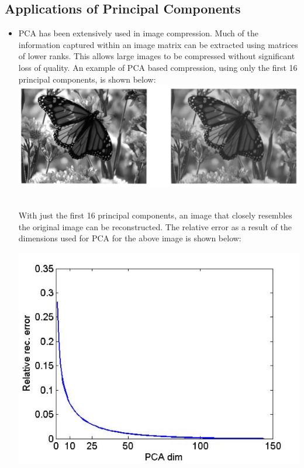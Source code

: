 \documentclass{article}
\begin{document}
\subsection{Applications of Principal Components}
\begin{itemize}
\item \begin{minipage}[t]{\linewidth}
	PCA has been extensively used in image compression. Much of the 	information captured within an image matrix can be extracted using matrices of lower ranks. This allows large images to be compressed without significant loss of quality. An example of PCA based compression, using only the first 16 principal components, is shown below:\\

  \centering
  \includegraphics[width=\textwidth]{compare}
  \label{fig:sample_figure}

\raggedright
$\,$\\
With just the first 16 principal components, an image that closely resembles the original image can be reconstructed. The relative error as a result of the dimensions used for PCA for the above image is shown below:

  \centering
  \includegraphics[width=\textwidth]{PCA_dim}
  \label{fig:sample_figure}
\end{minipage}


\end{itemize}
\end{document}
